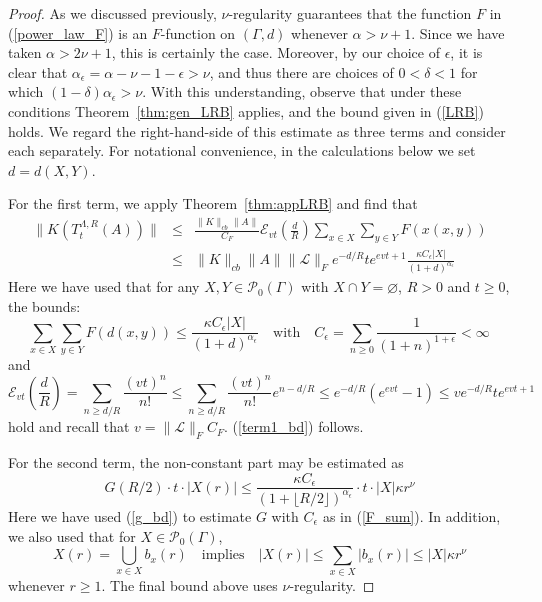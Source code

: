 \documentclass[10pt,a4paper]{amsart}
\let\emptyset\varnothing
\numberwithin{equation}{section}
\newcommand{\E}{\mathscr{E}}
\begin{document}
\begin{proof}
As we discussed previously, $\nu$-regularity guarantees that the function $F$ in (\ref{power_law_F}) is an $F$-function on 
$(\Gamma, d)$ whenever $\alpha > \nu +1$.  Since we have taken $\alpha > 2 \nu +1$, this is certainly the case. Moreover, by our choice of 
$\epsilon$, it is clear that $\alpha_{\epsilon} = \alpha - \nu - 1 - \epsilon > \nu$, and thus there are choices of $0< \delta <1$ for which
$(1 - \delta) \alpha_{\epsilon} > \nu$. With this understanding, observe that under these conditions
Theorem~\ref{thm:gen_LRB} applies, and the bound given in (\ref{LRB}) holds. We regard the right-hand-side of this estimate
as three terms and consider each separately. For notational convenience, in the calculations below we set $d=d(X,Y)$.  

For the first term, we apply Theorem~\ref{thm:appLRB} and find that 
\begin{eqnarray} \label{term1_bd}
\| K(T_t^{\Lambda, R}(A)) \| & \leq & \frac{ \| K \|_{cb} \| A \|}{C_F} \E_{vt} \left( \frac{d}{R} \right) \sum_{x \in X} \sum_{y \in Y} F(x(x,y)) \nonumber \\
& \leq &  \| K \|_{cb} \| A \|  \| \mathscr{L} \|_F e^{- d/R} t e^{evt+1} \frac{ \kappa C_{\epsilon} |X|}{(1+d)^{\alpha_\epsilon}}
\end{eqnarray}
Here we have used that for any $X,Y \in \mathcal{P}_0(\Gamma)$ with $X \cap Y = \emptyset$, $R>0$ and $t\geq0$, the bounds:
\begin{equation} \label{F_sum}
\sum_{x \in X} \sum_{y \in Y} F(d(x,y)) \leq \frac{ \kappa C_{\epsilon} |X|}{(1+d)^{\alpha_\epsilon}} \quad \mbox{with} \quad C_{\epsilon} = \sum_{n \geq 0} \frac{1}{(1+ n)^{ 1+ \epsilon}}< \infty \, 
\end{equation}
and 
\begin{equation} \label{E_bd}
\E_{vt} \left( \frac{d}{R} \right) = \sum_{n \geq d/R} \frac{(vt)^n}{n!}  \leq  \sum_{n \geq d/R} \frac{(vt)^n}{n!} e^{n - d/R} 
 \leq  e^{- d/R} \left(e^{evt}-1 \right) \leq v e^{-d/R} te^{evt+1}
\end{equation}
hold and recall that $v = \| \mathscr{L} \|_F C_F$. (\ref{term1_bd}) follows. 

For the second term, the non-constant part may be estimated as
\begin{equation} \label{term2_bd}
G(R/2) \cdot t \cdot |X(r)| \leq \frac{\kappa C_{\epsilon}}{(1+ \lfloor R/2 \rfloor)^{\alpha_\epsilon}} \cdot t \cdot |X| \kappa r^{\nu}
\end{equation}
Here we have used (\ref{g_bd}) to estimate $G$ with $C_{\epsilon}$ as in (\ref{F_sum}). In addition, we also used that for $X \in \mathcal{P}_0(\Gamma)$,
\begin{equation}
X(r) = \bigcup_{x \in X} b_x(r) \quad \mbox{implies} \quad |X(r)| \leq \sum_{x \in X} |b_x(r)| \leq |X| \kappa r^{\nu} 
\end{equation}
whenever $r\geq1$. The final bound above uses $\nu$-regularity. 


\end{proof}
\end{document}
